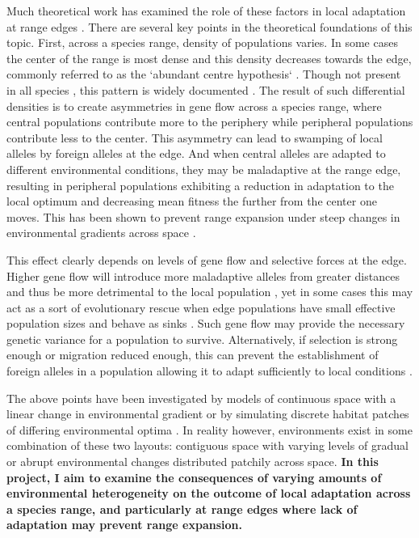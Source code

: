 Much theoretical work has examined the role of these factors in local adaptation at range edges \citep{GarciaRamos:1997,Ibrahim:1996,Gomulkiewicz:1995,Atkins:2010}. There are several key points in the theoretical foundations of this topic. First, across a species range, density of populations varies. In some cases the center of the range is most dense and this density decreases towards the edge, commonly referred to as the `abundant centre hypothesis` \citep{Brown:1984}. Though not present in all species \citep{Sagarin:2006}, this pattern is widely documented \citep{Antonovics:1976,Yeh:1979,Eckert:2008}. %
The result of such differential densities is to create asymmetries in gene flow across a species range, where central populations contribute more to the periphery while peripheral populations contribute less to the center. This asymmetry can lead to swamping of local alleles by foreign alleles at the edge. And when central alleles are adapted to different environmental conditions, they may be maladaptive at the range edge, resulting in peripheral populations exhibiting a reduction in adaptation to the local optimum and decreasing mean fitness the further from the center one moves. This has been shown to prevent range expansion under steep changes in environmental gradients across space \citep{Kirkpatrick:1997}.

This effect clearly depends on levels of gene flow and selective forces at the edge. Higher gene flow will introduce more maladaptive alleles from greater distances and thus be more detrimental to the local population \citep{GarciaRamos:1997}, yet in some cases this may act as a sort of evolutionary rescue when edge populations have small effective population sizes and behave as sinks \citep{Holt:1997,Gomulkiewicz:1999,Ching:2012}. Such gene flow may provide the necessary genetic variance for a population to survive. Alternatively, if selection is strong enough or migration reduced enough, this can prevent the establishment of foreign alleles in a population allowing it to adapt sufficiently to local conditions \citep{Ronce:2001}.

The above points have been investigated by models of continuous space with a linear change in environmental gradient \citep{Pease:1989,Kirkpatrick:1997,GarciaRamos:1997,Case:2000,Polechova:2009,Bridle:2010} or by simulating discrete habitat patches of differing environmental optima \citep{Aguilee:2012,Ronce:2001,Gomulkiewicz:1999}. In reality however, environments exist in some combination of these two layouts: contiguous space with varying levels of gradual or abrupt environmental changes distributed patchily across space. \textbf{In this project, I aim to examine the consequences of varying amounts 
of environmental heterogeneity on the outcome of local adaptation across a species range, and particularly at range edges where lack of adaptation may prevent range expansion.}

